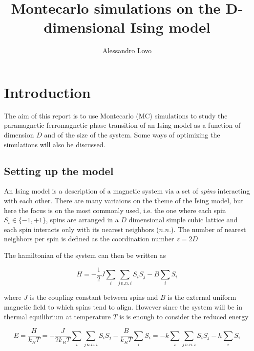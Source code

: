 \documentclass[a4paper, 11pt]{article}
\begin{document}
\title{Montecarlo simulations on the D-dimensional Ising model}
\author{Alessandro Lovo}

\maketitle


\section{Introduction}
  The aim of this report is to use Montecarlo (MC) simulations to study the paramagnetic-ferromagnetic phase transition of an Ising model as a function of dimension $D$ and of the size of the system. Some ways of optimizing the simulations will also be discussed.

  \subsection{Setting up the model}
    An Ising model is a description of a magnetic system via a set of \emph{spins} interacting with each other.
    There are many variaions on the theme of the Ising model, but here the focus is on the most commonly used, i.e. the one where each spin $S_i \in \{-1, +1\}$, spins are arranged in a $D$ dimensional simple cubic lattice and each spin interacts only with its nearest neighbors ($n.n.$).
    The number of nearest neighbors per spin is defined as the coordination number $z = 2D$

    The hamiltonian of the system can then be written as

    \begin{equation*}
      H = -\frac{1}{2} J \sum_i \sum_{j \, n.n. \, i} S_i S_j - B \sum_i S_i
    \end{equation*}

    where $J$ is the coupling constant between spins and $B$ is the external uniform magnetic field to which spins tend to align. However since the system will be in thermal equilibrium at temperature $T$ is is enough to consider the reduced energy

    \begin{equation*}
      E = \frac{H}{k_BT} = -\frac{J}{2k_BT}  \sum_i \sum_{j \, n.n. \, i} S_i S_j - \frac{B}{k_BT} \sum_i S_i = -k\sum_i \sum_{j \, n.n. \, i} S_i S_j - h\sum_i S_i
    \end{equation*}
\end{document}
